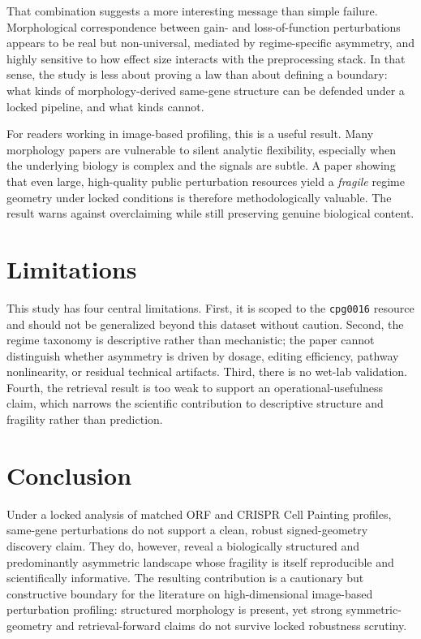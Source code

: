 \documentclass[11pt]{article}
\begin{document}
That combination suggests a more interesting message than simple failure. Morphological correspondence between gain- and loss-of-function perturbations appears to be real but non-universal, mediated by regime-specific asymmetry, and highly sensitive to how effect size interacts with the preprocessing stack. In that sense, the study is less about proving a law than about defining a boundary: what kinds of morphology-derived same-gene structure can be defended under a locked pipeline, and what kinds cannot.

For readers working in image-based profiling, this is a useful result. Many morphology papers are vulnerable to silent analytic flexibility, especially when the underlying biology is complex and the signals are subtle. A paper showing that even large, high-quality public perturbation resources yield a \emph{fragile} regime geometry under locked conditions is therefore methodologically valuable. The result warns against overclaiming while still preserving genuine biological content.

\section{Limitations}
This study has four central limitations. First, it is scoped to the \texttt{cpg0016} resource and should not be generalized beyond this dataset without caution. Second, the regime taxonomy is descriptive rather than mechanistic; the paper cannot distinguish whether asymmetry is driven by dosage, editing efficiency, pathway nonlinearity, or residual technical artifacts. Third, there is no wet-lab validation. Fourth, the retrieval result is too weak to support an operational-usefulness claim, which narrows the scientific contribution to descriptive structure and fragility rather than prediction.

\section{Conclusion}
Under a locked analysis of matched ORF and CRISPR Cell Painting profiles, same-gene perturbations do not support a clean, robust signed-geometry discovery claim. They do, however, reveal a biologically structured and predominantly asymmetric landscape whose fragility is itself reproducible and scientifically informative. The resulting contribution is a cautionary but constructive boundary for the literature on high-dimensional image-based perturbation profiling: structured morphology is present, yet strong symmetric-geometry and retrieval-forward claims do not survive locked robustness scrutiny.
\end{document}
